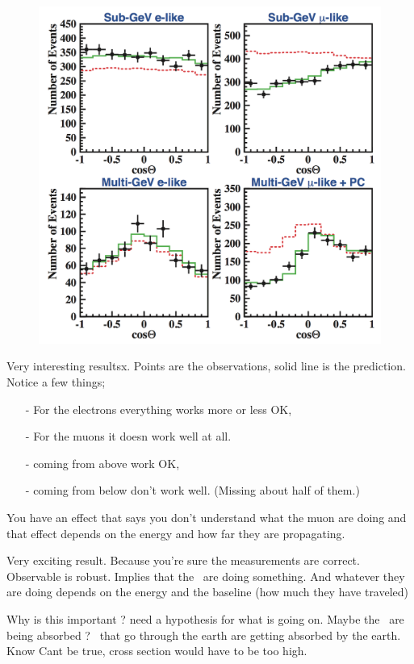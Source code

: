 {\begin{figure}[h!]
\centering
\includegraphics[width=1.0\textwidth]{./sk.png}
\end{figure}
\clearpage

Very interesting resultsx.
Points are the observations, solid line is the prediction.
Notice a few things; 
\begin{itemize}
\item[-] For the electrons everything works more or less OK, 
\item[-] For the muons it doesn work well at all.
\item[-] \nus coming from above work OK, 
\item[-] \nus coming from below don't work well. (Missing about half of them.)
\end{itemize}
You have an effect that says you don't understand what the muon \nus are doing and that effect depends on the energy and how far they are propagating.


Very exciting result. 
Because you're sure the measurements are correct. 
Observable is robust. 
Implies that the \nus\ are doing something. 
And whatever they are doing depends on the energy and the baseline (how much they have traveled)

Why is this important ? need a hypothesis for what is going on. 
Maybe the \nus\ are being absorbed ? 
\nus\ that go through the earth are getting absorbed by the earth. 
Know Cant be true,  cross section would have to be too high. 

}
